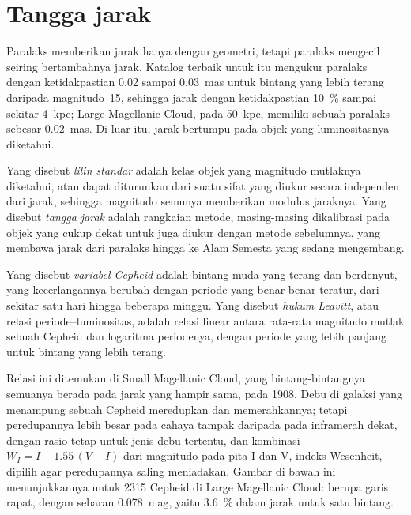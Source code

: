 \section{Tangga jarak}\label{sec:b3:milky-way-galaxies:ladder}

Paralaks memberikan jarak hanya dengan geometri, tetapi paralaks mengecil
seiring bertambahnya jarak. Katalog terbaik untuk itu mengukur paralaks dengan
ketidakpastian 0.02 sampai \qty{0.03}{mas} untuk bintang yang lebih terang daripada
magnitudo~15, sehingga jarak dengan ketidakpastian \qty{10}{\percent} sampai sekitar
\qty{4}{kpc}; Large Magellanic Cloud, pada \qty{50}{kpc}, memiliki sebuah
paralaks sebesar \qty{0.02}{mas}. Di luar itu, jarak bertumpu pada objek
yang luminositasnya diketahui.

\begin{definition}\label{def:b3:milky-way-galaxies:ladder}
Yang disebut \emph{lilin standar} adalah kelas objek
yang magnitudo mutlaknya diketahui, atau dapat diturunkan dari suatu sifat
yang diukur secara independen dari jarak, sehingga magnitudo semunya memberikan
modulus jaraknya. Yang disebut \emph{tangga jarak} adalah
rangkaian metode, masing-masing dikalibrasi pada objek yang cukup dekat untuk
juga diukur dengan metode sebelumnya, yang membawa jarak dari
paralaks hingga ke Alam Semesta yang sedang mengembang.
\end{definition}

\begin{definition}\label{def:b3:milky-way-galaxies:cepheid}
Yang disebut \emph{variabel Cepheid} adalah bintang muda yang terang dan berdenyut,
yang kecerlangannya berubah dengan periode yang benar-benar teratur,
dari sekitar satu hari hingga beberapa minggu. Yang disebut \emph{hukum Leavitt},
atau relasi periode--luminositas, adalah relasi linear antara rata-rata magnitudo mutlak
sebuah Cepheid dan logaritma periodenya, dengan periode
yang lebih panjang untuk bintang yang lebih terang.
\end{definition}

Relasi ini ditemukan di Small Magellanic Cloud, yang bintang-bintangnya
semuanya berada pada jarak yang hampir sama, pada 1908. Debu di galaksi yang
menampung sebuah Cepheid meredupkan dan memerahkannya; tetapi peredupannya lebih besar
pada cahaya tampak daripada pada inframerah dekat, dengan rasio tetap untuk jenis
debu tertentu, dan kombinasi $W_I = I - 1.55\,(V - I)$ dari magnitudo pada
pita I dan V, indeks Wesenheit, dipilih agar peredupannya
saling meniadakan. Gambar di bawah ini menunjukkannya untuk 2315 Cepheid di
Large Magellanic Cloud:  berupa garis rapat, dengan sebaran
\qty{0.078}{mag}, yaitu \qty{3.6}{\percent} dalam jarak untuk satu
bintang.

